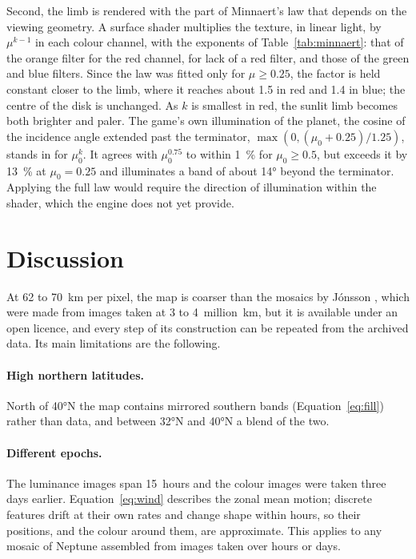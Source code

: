 \documentclass[11pt,a4paper]{article}
\begin{document}
Second, the limb is rendered with the part of Minnaert's law that depends on the viewing geometry.
A surface shader multiplies the texture, in linear light, by $\mu^{k-1}$ in each colour channel,
with the exponents of Table~\ref{tab:minnaert}: that of the orange filter for the red channel, for
lack of a red filter, and those of the green and blue filters. Since the law was fitted only for
$\mu \geq 0.25$, the factor is held constant closer to the limb, where it reaches about 1.5 in red
and 1.4 in blue; the centre of the disk is unchanged. As $k$ is smallest in red, the sunlit limb
becomes both brighter and paler. The game's own illumination of the planet, the cosine of the
incidence angle extended past the terminator, $\max\left(0, (\mu_{0} + 0.25)/1.25\right)$, stands
in for $\mu_{0}^{k}$. It agrees with $\mu_{0}^{0.75}$ to within \SI{1}{\percent} for
$\mu_{0} \geq 0.5$, but exceeds it by \SI{13}{\percent} at $\mu_{0} = 0.25$ and illuminates a band
of about \ang{14} beyond the terminator. Applying the full law would require the direction of
illumination within the shader, which the engine does not yet provide.

\section{Discussion}\label{sec:discussion}

At 62 to 70~km per pixel, the map is coarser than the mosaics by Jónsson
\citep{lakdawalla2014}, which were made from images taken at 3 to 4~million~km, but it is available under an open licence, and every step
of its construction can be repeated from the archived data. Its main limitations are the
following.

\paragraph{High northern latitudes.} North of \ang{40}N the map contains mirrored southern bands
(Equation~\ref{eq:fill}) rather than data, and between \ang{32}N and \ang{40}N a blend of the two.

\paragraph{Different epochs.} The luminance images span 15~hours and the colour images were taken
three days earlier. Equation~\eqref{eq:wind} describes the zonal mean motion; discrete features
drift at their own rates and change shape within hours, so their positions, and the colour around
them, are approximate. This applies to any mosaic of Neptune assembled from images taken over
hours or days.
\end{document}

